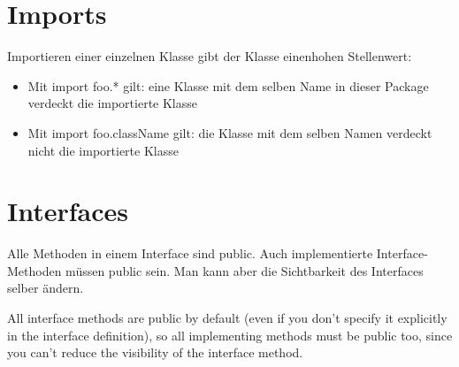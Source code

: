 \documentclass[UTF8]{article}
\begin{document}
\section{Imports}

Importieren einer einzelnen Klasse gibt der Klasse einenhohen Stellenwert:

\begin{itemize}
    \item Mit import foo.* gilt: eine Klasse mit dem selben Name in dieser Package verdeckt die importierte Klasse
    \item Mit import foo.className gilt: die Klasse mit dem selben Namen verdeckt nicht die importierte Klasse
\end{itemize}

\section{Interfaces}

Alle Methoden in einem Interface sind public. Auch implementierte Interface-Methoden müssen public sein. Man kann aber die Sichtbarkeit des Interfaces selber ändern.

All interface methods are public by default (even if you don't specify it explicitly in the interface definition), so all implementing methods must be public too, since you can't reduce the visibility of the interface method.
\end{document}

